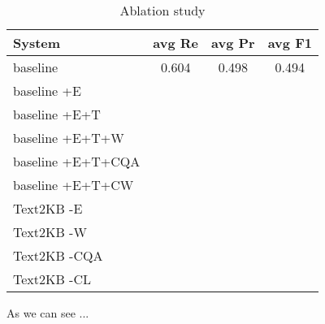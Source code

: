 \begin{table}
\caption{Ablation study}
\label{table:webquestions_ablation}
\begin{tabular}{| p{4cm} | c | c | c | }
\hline
System & avg Re & avg Pr &  avg F1 \\
\hline
baseline & 0.604 & 0.498 & 0.494\\
baseline +E & & & \\
baseline +E+T & & & \\
baseline +E+T+W & & & \\
baseline +E+T+CQA & & & \\
baseline +E+T+CW & & & \\
\hline
Text2KB -E & & & \\
Text2KB -W & & & \\
Text2KB -CQA & & & \\
Text2KB -CL & & & \\
\hline
\end{tabular}
\end{table}

As we can see ...